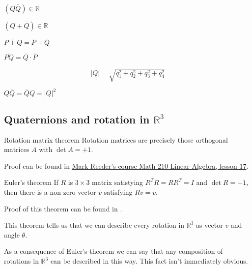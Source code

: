 \begin{observation}
$(Q \overline{Q}) \in \mathbb{R}$
\end{observation}

\begin{observation}
$(Q + \overline{Q}) \in \mathbb{R}$
\end{observation}

\begin{observation}
$\overline{P+Q} = \overline{P} + \overline{Q}$
\end{observation}

\begin{observation}
$\overline{PQ} = \overline{Q} \cdot \overline{P}$
\end{observation}

\begin{definition}
$$|Q| = \sqrt{q_1^2 + q_2^2 + q_3^2 + q_4^2}$$
\end{definition}

\begin{observation}
$Q \overline{Q} = \overline{Q} Q = |Q|^2$
\end{observation}

\subsection{Quaternions and rotation in $\mathbb{R}^3$}

\begin{theorem}{Rotation matrix theorem}
Rotation matrices are precisely those orthogonal matrices $A$ with $\det A = +1$.
\end{theorem}

Proof can be found in \href{https://www2.bc.edu/~reederma/Linalg17.pdf}{Mark Reeder's course Math 210 Linear Algebra, lesson 17}.


\begin{theorem}{Euler's theorem}
If $R$ is $3 \times 3$ matrix satistying $R^T R = R R^T = I$ and $\det R = +1$, then there is a non-zero vector $v$ satisfying $Rv = v$.
\end{theorem}

Proof of this theorem can be found in \cite{palais2007euler}.


This theorem tells us that we can describe every rotation in $\mathbb{R}^3$ as vector $v$ and angle $\theta$.

As a consequence of Euler's theorem we can say that any composition of rotations in $\mathbb{R}^3$ can be described in this way. This fact isn't immediately obvious. 

